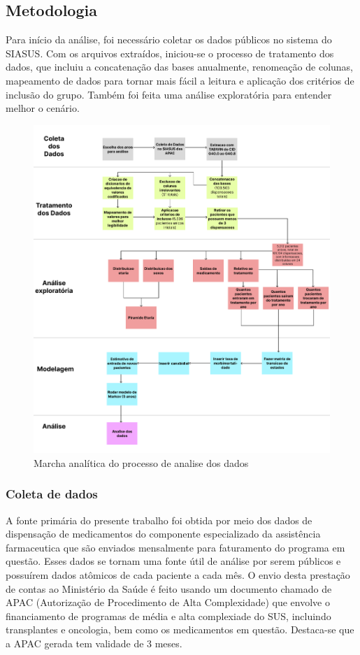 \documentclass[article,a4paper,12pt,brazil,sumario=tradicional]{abntex2}
\begin{document}
\subsection{Metodologia}

Para início da análise, foi necessário coletar os dados públicos no sistema do SIASUS. Com os arquivos extraídos, iniciou-se o processo de tratamento dos dados, que incluiu a concatenação das bases anualmente, renomeação de colunas, mapeamento de dados para tornar mais fácil a leitura e aplicação dos critérios de inclusão do grupo. Também foi feita uma análise exploratória para entender melhor o cenário.

\begin{figure}[!ht]
    \centering
    \includegraphics[width=1\textwidth]{marcha_analitica.png}
    \caption{Marcha analítica do processo de analise dos dados}
    \label{fig:marcha_analitica}
\end{figure}

\subsubsection{Coleta de dados}

A fonte primária do presente trabalho foi obtida por meio dos dados de dispensação de medicamentos do componente especializado da assistência farmaceutica que são enviados mensalmente para faturamento do programa em questão. Esses dados se tornam uma fonte útil de análise por serem públicos e possuírem dados atômicos de cada paciente a cada mês. O envio desta prestação de contas ao Ministério da Saúde é feito usando um documento chamado de APAC (Autorização de Procedimento de Alta Complexidade) que envolve o financiamento de programas de média e alta complexiade do SUS, incluindo transplantes e oncologia, bem como os medicamentos em questão. Destaca-se que a APAC gerada tem validade de 3 meses.
\end{document}
